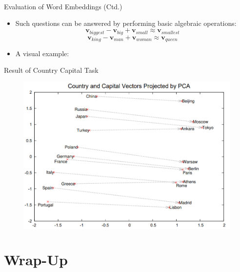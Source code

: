 \begin{frame}{Evaluation of Word Embeddings (Ctd.)}{}
	\begin{itemize}
		\item Such questions can be answered by performing basic algebraic operations:
		\begin{equation*}
			\bm{v}_{biggest} - \bm{v}_{big} + \bm{v}_{small} \approx \bm{v}_{smallest}
		\end{equation*}
		\begin{equation*}
			\bm{v}_{king} - \bm{v}_{man} + \bm{v}_{woman} \approx \bm{v}_{queen}
		\end{equation*}
		\item A visual example:
		
	\end{itemize}
\end{frame}


\begin{frame}{Result of Country Capital Task}{}
	\begin{figure}
		\includegraphics[scale=0.3]{10_deep_learning/02_img/country_capital}
	\end{figure}
\end{frame}


\section{Wrap-Up}

